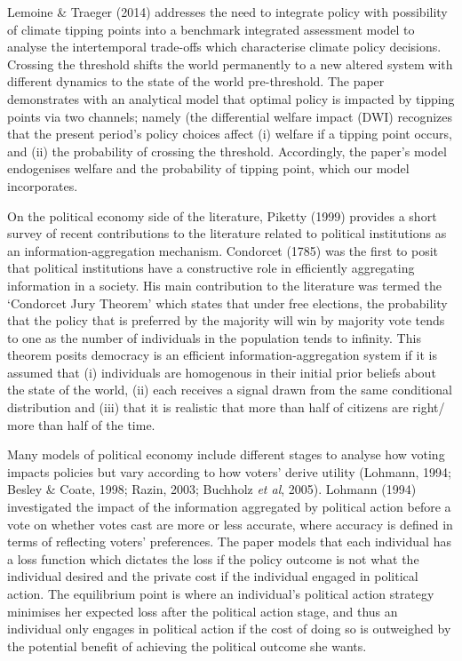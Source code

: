 \documentclass[11pt,preprint, authoryear]{elsarticle}
\numberwithin{equation}{section}
\numberwithin{figure}{section}
\numberwithin{table}{section}
\begin{document}
Lemoine \& Traeger (2014) addresses the need to integrate policy with
possibility of climate tipping points into a benchmark integrated
assessment model to analyse the intertemporal trade-offs which
characterise climate policy decisions. Crossing the threshold shifts the
world permanently to a new altered system with different dynamics to the
state of the world pre-threshold. The paper demonstrates with an
analytical model that optimal policy is impacted by tipping points via
two channels; namely (the differential welfare impact (DWI) recognizes
that the present period's policy choices affect (i) welfare if a tipping
point occurs, and (ii) the probability of crossing the threshold.
Accordingly, the paper's model endogenises welfare and the probability
of tipping point, which our model incorporates.

On the political economy side of the literature, Piketty (1999) provides
a short survey of recent contributions to the literature related to
political institutions as an information-aggregation mechanism.
Condorcet (1785) was the first to posit that political institutions have
a constructive role in efficiently aggregating information in a society.
His main contribution to the literature was termed the `Condorcet Jury
Theorem' which states that under free elections, the probability that
the policy that is preferred by the majority will win by majority vote
tends to one as the number of individuals in the population tends to
infinity. This theorem posits democracy is an efficient
information-aggregation system if it is assumed that (i) individuals are
homogenous in their initial prior beliefs about the state of the world,
(ii) each receives a signal drawn from the same conditional distribution
and (iii) that it is realistic that more than half of citizens are
right/ more than half of the time.

Many models of political economy include different stages to analyse how
voting impacts policies but vary according to how voters' derive utility
(Lohmann, 1994; Besley \& Coate, 1998; Razin, 2003; Buchholz \emph{et
al}, 2005). Lohmann (1994) investigated the impact of the information
aggregated by political action before a vote on whether votes cast are
more or less accurate, where accuracy is defined in terms of reflecting
voters' preferences. The paper models that each individual has a loss
function which dictates the loss if the policy outcome is not what the
individual desired and the private cost if the individual engaged in
political action. The equilibrium point is where an individual's
political action strategy minimises her expected loss after the
political action stage, and thus an individual only engages in political
action if the cost of doing so is outweighed by the potential benefit of
achieving the political outcome she wants.
\end{document}
